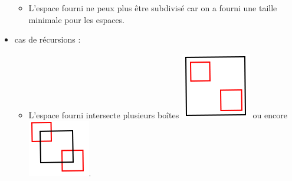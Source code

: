 \begin{itemize}
\begin{itemize}
\item L'espace fourni ne peux plus être subdivisé car on a fourni une taille minimale pour les espaces.
\end{itemize}
\item cas de récursions :
\begin{itemize}
\item L'espace fourni intersecte plusieurs boîtes \includegraphics[scale=0.20]{img/QT4} ou encore \includegraphics[scale=0.20]{img/QT5}.
\end{itemize}
\end{itemize}

